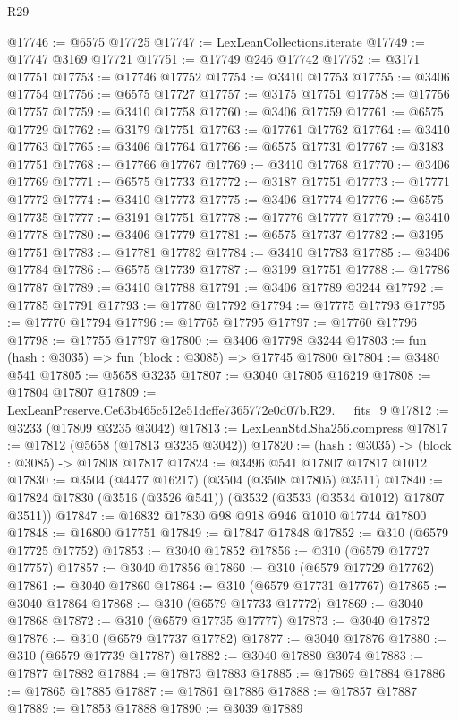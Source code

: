 \begin{lexlean}{R29}
\begin{coremodule}
@17746 := @6575 @17725
@17747 := LexLeanCollections.iterate
@17749 := @17747 @3169 @17721
@17751 := @17749 @246 @17742
@17752 := @3171 @17751
@17753 := @17746 @17752
@17754 := @3410 @17753
@17755 := @3406 @17754
@17756 := @6575 @17727
@17757 := @3175 @17751
@17758 := @17756 @17757
@17759 := @3410 @17758
@17760 := @3406 @17759
@17761 := @6575 @17729
@17762 := @3179 @17751
@17763 := @17761 @17762
@17764 := @3410 @17763
@17765 := @3406 @17764
@17766 := @6575 @17731
@17767 := @3183 @17751
@17768 := @17766 @17767
@17769 := @3410 @17768
@17770 := @3406 @17769
@17771 := @6575 @17733
@17772 := @3187 @17751
@17773 := @17771 @17772
@17774 := @3410 @17773
@17775 := @3406 @17774
@17776 := @6575 @17735
@17777 := @3191 @17751
@17778 := @17776 @17777
@17779 := @3410 @17778
@17780 := @3406 @17779
@17781 := @6575 @17737
@17782 := @3195 @17751
@17783 := @17781 @17782
@17784 := @3410 @17783
@17785 := @3406 @17784
@17786 := @6575 @17739
@17787 := @3199 @17751
@17788 := @17786 @17787
@17789 := @3410 @17788
@17791 := @3406 @17789 @3244
@17792 := @17785 @17791
@17793 := @17780 @17792
@17794 := @17775 @17793
@17795 := @17770 @17794
@17796 := @17765 @17795
@17797 := @17760 @17796
@17798 := @17755 @17797
@17800 := @3406 @17798 @3244
@17803 := fun (hash : @3035) => fun (block : @3085) => @17745 @17800
@17804 := @3480 @541
@17805 := @5658 @3235
@17807 := @3040 @17805 @16219
@17808 := @17804 @17807
@17809 := LexLeanPreserve.Ce63b465c512e51dcffe7365772e0d07b.R29.__fits_9
@17812 := @3233 (@17809 @3235 @3042)
@17813 := LexLeanStd.Sha256.compress
@17817 := @17812 (@5658 (@17813 @3235 @3042))
@17820 := (hash : @3035) -> (block : @3085) -> @17808 @17817
@17824 := @3496 @541 @17807 @17817 @1012
@17830 := @3504 (@4477 @16217) (@3504 (@3508 @17805) @3511)
@17840 := @17824 @17830 (@3516 (@3526 @541)) (@3532 (@3533 (@3534 @1012) @17807 @3511))
@17847 := @16832 @17830 @98 @918 @946 @1010 @17744 @17800
@17848 := @16800 @17751
@17849 := @17847 @17848
@17852 := @310 (@6579 @17725 @17752)
@17853 := @3040 @17852
@17856 := @310 (@6579 @17727 @17757)
@17857 := @3040 @17856
@17860 := @310 (@6579 @17729 @17762)
@17861 := @3040 @17860
@17864 := @310 (@6579 @17731 @17767)
@17865 := @3040 @17864
@17868 := @310 (@6579 @17733 @17772)
@17869 := @3040 @17868
@17872 := @310 (@6579 @17735 @17777)
@17873 := @3040 @17872
@17876 := @310 (@6579 @17737 @17782)
@17877 := @3040 @17876
@17880 := @310 (@6579 @17739 @17787)
@17882 := @3040 @17880 @3074
@17883 := @17877 @17882
@17884 := @17873 @17883
@17885 := @17869 @17884
@17886 := @17865 @17885
@17887 := @17861 @17886
@17888 := @17857 @17887
@17889 := @17853 @17888
@17890 := @3039 @17889

\end{coremodule}
\end{lexlean}
